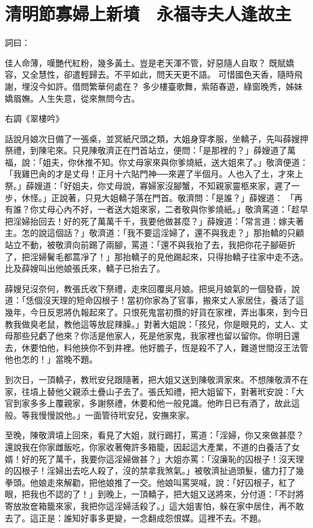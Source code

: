 %

\chapter{清明節寡婦上新墳　永福寺夫人逢故主}

詞曰：

佳人命薄，嘆艷代紅粉，幾多黃土。豈是老天渾不管，好惡隨人自取？ 既賦嬌容，又全慧性，卻遣輕歸去。不平如此，問天天更不語。 可惜國色天香，隨時飛謝，埋沒今如許。借問繁華何處在？ 多少樓臺歌舞，紫陌春遊，綠窗晚秀，姊妹嬌眉嫵。人生失意，從來無問今古。

右調《翠樓吟》

話說月娘次日備了一張桌，並冥紙尺頭之類，大姐身穿孝服，坐轎子，先叫薛嫂押祭禮，到陳宅來。只見陳敬濟正在門首站立，便問：「是那裡的？」薛嫂道了萬福，說：「姐夫，你休推不知。你丈母家來與你爹燒紙，送大姐來了。」敬濟便道：「我雞巴肏的才是丈母！正月十六貼門神──來遲了半個月。人也入了土，才來上祭。」薛嫂道：「好姐夫，你丈母說，寡婦家沒腳蟹，不知親家靈柩來家，遲了一步，休怪。」正說著，只見大姐轎子落在門首。敬濟問：「是誰？」薛嫂道： 「再有誰？你丈母心內不好，一者送大姐來家，二者敬與你爹燒紙。」敬濟罵道：「趁早把淫婦抬回去！好的死了萬萬千千，我要他做甚麼？」薛嫂道：「常言道：嫁夫著主。怎的說這個話？」敬濟道：「我不要這淫婦了，還不與我走？」那抬轎的只顧站立不動，被敬濟向前踢了兩腳，罵道：「還不與我抬了去，我把你花子腳砸折了，把淫婦鬢毛都蒿凈了！」那抬轎子的見他踢起來，只得抬轎子往家中走不迭。比及薛嫂叫出他娘張氏來，轎子已抬去了。

薛嫂兒沒奈何，教張氏收下祭禮，走來回覆吳月娘。把吳月娘氣的一個發昏，說道：「恁個沒天理的短命囚根子！當初你家為了官事，搬來丈人家居住，養活了這幾年，今日反恩將仇報起來了。只恨死鬼當初攬的好貨在家裡，弄出事來，到今日教我做臭老鼠，教他這等放屁辣臊。」對著大姐說：「孩兒，你是眼見的，丈人、丈母那些兒虧了他來？你活是他家人，死是他家鬼，我家裡也留以留你。你明日還去，休要怕他，料他挾你不到井裡。他好膽子，恆是殺不了人，難道世間沒王法管他也怎的！」當晚不題。

到次日，一頂轎子，教玳安兒跟隨著，把大姐又送到陳敬濟家來。不想陳敬濟不在家，往墳上替他父親添土疊山子去了。張氏知禮，把大姐留下，對著玳安說：「大官到家多多上覆親家，多謝祭禮，休要和他一般見識。他昨日已有酒了，故此這般。等我慢慢說他。」一面管待玳安兒，安撫來家。

至晚，陳敬濟墳上回來，看見了大姐，就行踢打，罵道：「淫婦，你又來做甚麼？還說我在你家雌飯吃，你家收著俺許多箱籠，因起這大產業，不道的白養活了女婿！好的死了萬千，我要你這淫婦做甚？」大姐亦罵：「沒廉恥的囚根子！沒天理的囚根子！淫婦出去吃人殺了，沒的禁拿我煞氣。」被敬濟扯過頭髮，儘力打了幾拳頭。他娘走來解勸，把他娘推了一交。他娘叫罵哭喊，說：「好囚根子，紅了眼，把我也不認的了！」到晚上，一頂轎子，把大姐又送將來，分付道：「不討將寄放妝奩箱籠來家，我把你這淫婦活殺了。」這大姐害怕，躲在家中居住，再不敢去了。這正是：誰知好事多更變，一念翻成怨恨媒。這裡不去。不題。

